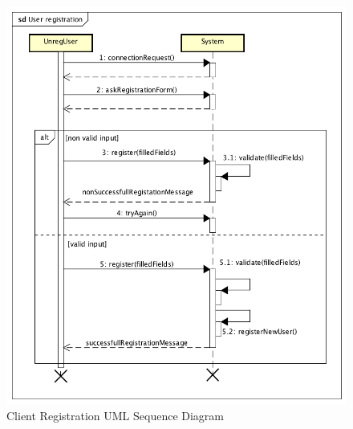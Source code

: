 \documentclass[a4paper]{article}
\begin{document}
\begin{enumerate}[label=\bfseries G\arabic*:]
\begin{figure}[H]
\includegraphics[width=\sequenceWidth]{Sequence-Client-Registration}
\centering
\caption{Client Registration UML Sequence Diagram}
\label{fig:sequenceclientregistration}
\end{figure}


\end{enumerate}
\end{document}
